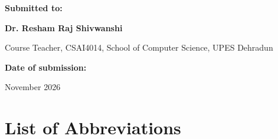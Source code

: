 \documentclass[12pt,a4paper]{report}
\begin{document}
\begin{titlepage}
    \vspace{1.0cm}
    
    \begin{flushleft}
    {\fontsize{12}{15}\selectfont \textbf{Submitted to:}\par}
    \vspace{0.1cm}
    {\fontsize{12}{16}\selectfont \textbf{Dr. Resham Raj Shivwanshi}\par}
    {\fontsize{11}{15}\selectfont Course Teacher, CSAI4014, School of Computer Science, UPES Dehradun\par}
    \end{flushleft}
    
    \vfill
    
    {\fontsize{12}{16}\selectfont \textbf{Date of submission:}\par}
    {\fontsize{11}{15}\selectfont November 2026\par}
    \vspace*{0.5cm}
\end{titlepage}

\setcounter{page}{1}

\tableofcontents
\newpage
\listoffigures
\newpage
\listoftables
\newpage

\chapter*{List of Abbreviations}
\setlength{\headheight}{15pt}
\addtolength{\topmargin}{-3pt}
\end{document}
